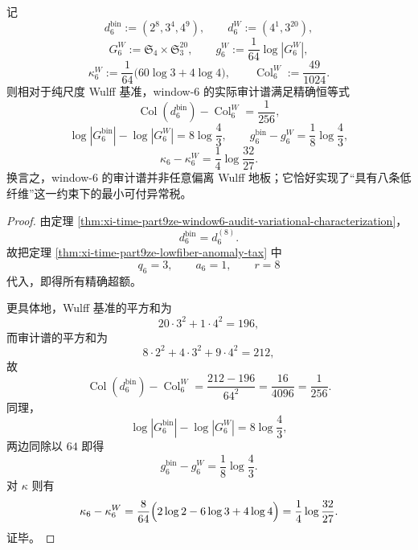 \begin{theorem}\label{thm:xi-time-part9ze-window6-exact-tax-identity}
记
\[
d_6^{\mathrm{bin}}:=(2^8,3^4,4^9),
\qquad
d_6^W:=(4^1,3^{20}),
\]
\[
G_6^W:=\mathfrak S_4\times \mathfrak S_3^{20},
\qquad
g_6^W:=\frac{1}{64}\log|G_6^W|,
\]
\[
\kappa_6^W:=\frac{1}{64}\bigl(60\log 3+4\log 4\bigr),
\qquad
\operatorname{Col}_6^W:=\frac{49}{1024}.
\]
则相对于纯尺度 Wulff 基准，window-\(6\) 的实际审计谱满足精确恒等式
\[
\operatorname{Col}(d_6^{\mathrm{bin}})-\operatorname{Col}_6^W=\frac{1}{256},
\]
\[
\log|G_6^{\mathrm{bin}}|-\log|G_6^W|=8\log\frac43,
\qquad
g_6^{\mathrm{bin}}-g_6^W=\frac18\log\frac43,
\]
\[
\kappa_6-\kappa_6^W=\frac14\log\frac{32}{27}.
\]
换言之，window-\(6\) 的审计谱并非任意偏离 Wulff 地板；它恰好实现了“具有八条低纤维”这一约束下的最小可付异常税。
\end{theorem}
\begin{proof}
由定理 \ref{thm:xi-time-part9ze-window6-audit-variational-characterization}，
\[
d_6^{\mathrm{bin}}=d_6^{(8)}.
\]
故把定理 \ref{thm:xi-time-part9ze-lowfiber-anomaly-tax} 中
\[
q_6=3,\qquad a_6=1,\qquad r=8
\]
代入，即得所有精确超额。

更具体地，Wulff 基准的平方和为
\[
20\cdot 3^2+1\cdot 4^2=196,
\]
而审计谱的平方和为
\[
8\cdot 2^2+4\cdot 3^2+9\cdot 4^2=212,
\]
故
\[
\operatorname{Col}(d_6^{\mathrm{bin}})-\operatorname{Col}_6^W
=\frac{212-196}{64^2}
=\frac{16}{4096}
=\frac{1}{256}.
\]
同理，
\[
\log|G_6^{\mathrm{bin}}|-\log|G_6^W|
=8\log\frac43,
\]
两边同除以 \(64\) 即得
\[
g_6^{\mathrm{bin}}-g_6^W=\frac18\log\frac43.
\]
对 \(\kappa\) 则有
\[
\kappa_6-\kappa_6^W
=
\frac{8}{64}\Bigl(2\log 2-6\log 3+4\log 4\Bigr)
=\frac14\log\frac{32}{27}.
\]
证毕。
\end{proof}

